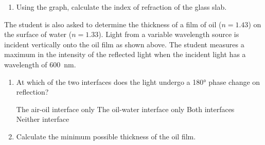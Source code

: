 \documentclass{../../../oss-classkick}
\begin{document}
\begin{enumerate}[leftmargin=15pt]
\begin{enumerate}
    \begin{center}
    \end{center}
  \item Using the graph, calculate the index of refraction of the glass slab.
  \end{enumerate}
  \begin{center}
  \end{center}
  The student is also asked to determine the thickness of a film of oil
  ($n=1.43$) on the surface of water ($n=1.33$). Light from a variable
  wavelength source is incident vertically onto the oil film as shown above.
  The student measures a maximum in the intensity of the reflected light when
  the incident light has a wavelength of \SI{600}{\nano\metre}.
  \begin{enumerate}[resume]
  \item At which of the two interfaces does the light undergo a \ang{180} phase
    change on reflection?

    \vspace{.1in}
    \underline{\hspace{.4in}} The air-oil interface only\hspace{.3in}
    \underline{\hspace{.4in}} The oil-water interface only\hspace{.3in}
    \underline{\hspace{.4in}} Both interfaces\hspace{.3in}\\
    \underline{\hspace{.4in}} Neither interface
    \vspace{.1in}
    
  \item Calculate the minimum possible thickness of the oil film.
  \end{enumerate}
\end{enumerate}
\end{document}

